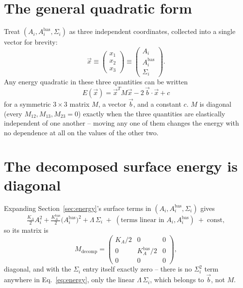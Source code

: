 \documentclass[11pt,a4paper]{report}
\begin{document}
\section*{The general quadratic form}
Treat $(A_i, A_i^{\mathrm{bas}}, \Sigma_i)$ as three independent
coordinates, collected into a single vector for brevity:
\begin{equation}
  \vec x \equiv
  \begin{pmatrix} x_1 \\ x_2 \\ x_3 \end{pmatrix}
  \equiv
  \begin{pmatrix} A_i \\ A_i^{\mathrm{bas}} \\ \Sigma_i \end{pmatrix} .
  \label{eq:xvec-def}
\end{equation}
Any energy quadratic in these three quantities can be written
\begin{equation}
  E(\vec x) = \vec x^{T} M \vec x - 2\,\vec b\cdot\vec x + c
\end{equation}
for a symmetric $3\times3$ matrix $M$, a vector $\vec b$, and a
constant $c$. $M$ is diagonal (every $M_{12},M_{13},M_{23}=0$) exactly
when the three quantities are elastically independent of one another
-- moving any one of them changes the energy with no dependence at all
on the values of the other two.

\section*{The decomposed surface energy is diagonal}
Expanding Section~\ref{sec:energy}'s surface terms in
$(A_i,A_i^{\mathrm{bas}},\Sigma_i)$ gives
\begin{equation}
  \tfrac{K_A}{2}A_i^2 + \tfrac{K_A^{\mathrm{bas}}}{2}\bigl(A_i^{\mathrm{bas}}\bigr)^2 + \Lambda\,\Sigma_i
  \;+\; (\text{terms linear in } A_i, A_i^{\mathrm{bas}}) \;+\;\text{const},
\end{equation}
so its matrix is
\begin{equation}
  M_{\mathrm{decomp}} =
  \begin{pmatrix} K_A/2 & 0 & 0 \\ 0 & K_A^{\mathrm{bas}}/2 & 0 \\ 0 & 0 & 0 \end{pmatrix},
  \label{eq:M-decomp}
\end{equation}
diagonal, and with the $\Sigma_i$ entry itself exactly zero -- there is
no $\Sigma_i^2$ term anywhere in Eq.~\eqref{eq:energy}, only the
linear $\Lambda\,\Sigma_i$, which belongs to $\vec b$, not $M$.
\end{document}
